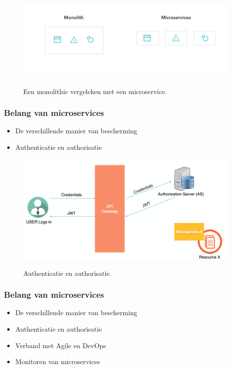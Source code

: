 \documentclass[aspectratio=169]{beamer}
\begin{document}
\begin{frame}
	\begin{figure}
		\caption{Een monolithic vergeleken met een microservice.}
		\includegraphics[height=.8\textheight]{img/Mono_Micro.png}
		\label{img:monolithic_microservices}
	\end{figure}
\end{frame}


\begin{frame}
	\frametitle{Belang van microservices}
	\begin{itemize}
		\item De verschillende manier van bescherming
		\item Authenticatie en authorisatie
	\end{itemize}
\end{frame}

\begin{frame}
	\begin{figure}
		\caption{Authenticatie en authorisatie.}
		\includegraphics[height=.8\textheight]{img/apiGateway_facadePattern.png}
		\label{img:APIgateway}
	\end{figure}
\end{frame}

\begin{frame}
	\frametitle{Belang van microservices}
	\begin{itemize}
		\item De verschillende manier van bescherming
		\item Authenticatie en authorisatie
		\item Verband met Agile en DevOps
		\item Monitoren van microservices
	\end{itemize}
\end{frame}
\end{document}
